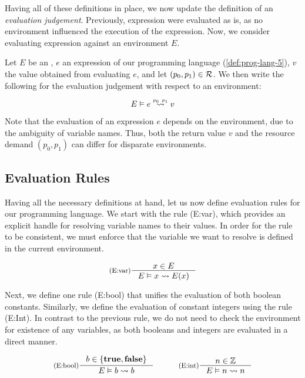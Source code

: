 Having all of these definitions in place, we now update the definition of an \emph{evaluation judgement}. Previously, expression were evaluated as is, as no environment influenced the execution of the expression. Now, we consider evaluating expression against an environment \(E\).

\begin{definition}\label{def:eval-judgement-environments}
   Let \(E\) be an , \(e\) an expression of our programming language (\cref{def:prog-lang-5}), \(v\) the value obtained from evaluating \(e\), and let \((p_0, p_1) \in \mathcal{R}\). We then write the following for the evaluation judgement with respect to an environment:

   \[
      \evals{E}{e}{v}{p_0}{p_1}
   \]
	
\end{definition}

\begin{remark}
   Note that the evaluation of an expression \(e\) depends on the environment, due to the ambiguity of variable names. Thus, both the return value \(v\) and the resource demand \((p_0, p_1)\) can differ for disparate environments. 
\end{remark}

\subsection{Evaluation Rules}\label{sec:evaluation-rules-var-tick}

Having all the necessary definitions at hand, let us now define evaluation rules for our programming language. We start with the rule (E:var), which provides an explicit handle for resolving variable names to their values. In order for the rule to be consistent, we must enforce that the variable we want to resolve is defined in the current environment. 

\[
   \inference[(E:var)]
   {\contains{E}{x}}
   {\evals{E}{x}{E(x)}{}{}}
\]

Next, we define one rule (E:bool) that unifies the evaluation of both boolean constants. Similarly, we define the evaluation of constant integers using the rule (E:Int). In contrast to the previous rule, we do not need to check the environment for existence of any variables, as both booleans and integers are evaluated in a direct manner.

\[
   \inference[(E:bool)]{b \in \{\true, \false\}}{\evals{E}{b}{b}{}{}}%
   \quad\quad\quad
   \inference[(E:int)]{n \in \mathbb{Z}}{\evals{E}{n}{n}{}{}}
\]

